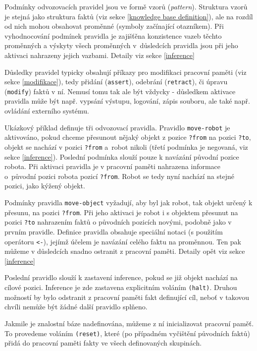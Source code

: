 Podmínky odvozovacích pravidel jsou ve formě vzorů (\emph{pattern}). Struktura
vzorů je stejná jako struktura faktů (viz sekce \ref{knowledge base
definition}), ale na rozdíl od nich mohou obsahovat proměnné (symboly začínající
otazníkem).  Při vyhodnocování podmínek pravidla je zajišťěna
konzistence vazeb těchto proměnných a výskyty všech proměnných v~důsledcích
pravidla jsou při jeho aktivaci nahrazeny jejich vazbami. Detaily viz sekce
\ref{inference}

Důsledky pravidel typicky obsahují příkazy pro modifikaci pracovní paměti (viz
sekce \ref{modifikace}), tedy přidání (\verb|assert|), odebrání
(\verb|retract|), či úpravu (\verb|modify|) faktů v ní. Nemusí tomu tak ale být
vždycky - důsledkem aktivace pravidla může být např. vypsání výstupu, logování,
zápis souboru, ale také např. ovládání externího systému.

Ukázkový příklad definuje tři odvozovací pravidla. Pravidlo
\verb|move-robot| je aktivováno, pokud chceme přesunout nějaký objekt z pozice
\verb|?from| na pozici \verb|?to|, objekt se nachází v pozici \verb|?from|
a~robot nikoli (třetí podmínka je negovaná, viz sekce \ref{inference}).
Poslední podmínka slouží pouze k navázání původní pozice robota.  Při aktivaci
pravidla je v pracovní paměti nahrazena informace o~původní pozici robota
pozicí \verb|?from|. Robot se tedy nyní nachází na stejné pozici, jako kýžený
objekt.

Podmínky pravidla \verb|move-object| vyžadují, aby byl jak robot, tak objekt
určený k přesunu, na pozici \verb|?from|. Při jeho aktivaci je robot i s objektem
přesunut na pozici \verb|?to| nahrazením faktů o původních pozicích novými,
podobně jako v prvním pravidle. Definice pravidla obsahuje speciální notaci (s
použitím operátoru \verb|<-|), jejímž účelem je navázání celého faktu na
proměnnou. Ten pak můžeme v důsledcích snadno ostranit z pracovní paměti.
Detaily opět viz sekce \ref{inference}

Poslední pravidlo slouží k zastavení inference, pokud se již objekt nachází na
cílové pozici. Inference je zde zastavena explicitním voláním \verb|(halt)|.
Druhou možností by bylo odstranit z pracovní paměti fakt definující cíl, neboť v
takovou chvíli nemůže být žádné další pravidlo splňeno.

Jakmile je znalostní báze nadefinována, můžeme z ní inicializovat pracovní
paměť. To provedeme voláním \verb|(reset)|, které (po případném vyčištění
původních faktů) přidá do pracovní paměti fakty ve všech definovaných skupinách.

